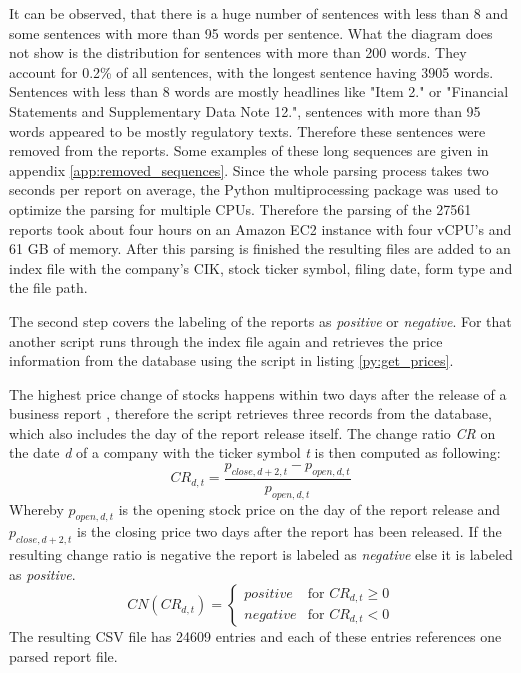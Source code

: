 It can be observed, that there is a huge number of sentences with less than 8 and some sentences with more than 95 words per sentence.
What the diagram does not show is the distribution for sentences with more than 200 words.
They account for 0.2\% of all sentences, with the longest sentence having 3905 words.
Sentences with less than 8 words are mostly headlines like "Item 2." or "Financial Statements and Supplementary Data Note 12.", sentences with more than 95 words appeared to be mostly regulatory texts.
Therefore these sentences were removed from the reports.
Some examples of these long sequences are given in appendix \ref{app:removed_sequences}.
Since the whole parsing process takes two seconds per report on average, the Python multiprocessing package was used to optimize the parsing for multiple \acs{CPU}s.
Therefore the parsing of the 27561 reports took about four hours on an Amazon EC2 instance with four v\acs{CPU}'s and 61 GB of memory.
After this parsing is finished the resulting files are added to an index file with the company's \ac{CIK}, stock ticker symbol, filing date, form type and the file path.

The second step covers the labeling of the reports as \textit{positive} or \textit{negative}.
For that another script runs through the index file again and retrieves the price information from the database using the script in listing \ref{py:get_prices}.

The highest price change of stocks happens within two days after the release of a business report \cite{Feldman2010}, therefore the script retrieves three records from the database, which also includes the day of the report release itself.
The change ratio \textit{CR} on the date \textit{d} of a company with the ticker symbol \textit{t} is then computed as following:
\begin{equation}
    CR_{d,t} = \frac{p_{close, d + 2, t} - p_{open, d, t}}{p_{open, d, t}}
\end{equation}
Whereby $p_{open, d, t}$ is the opening stock price on the day of the report release and $p_{close, d + 2, t}$ is the closing price two days after the report has been released.
If the resulting change ratio is negative the report is labeled as \textit{negative} else it is labeled as \textit{positive}.
\begin{equation}
    CN(CR_{d,t}) = \begin{cases}
        positive & \text{for } CR_{d,t} \geq 0 \\
        negative & \text{for } CR_{d,t} < 0
    \end{cases}
\end{equation}
The resulting \ac{CSV} file has 24609 entries and each of these entries references one parsed report file.

